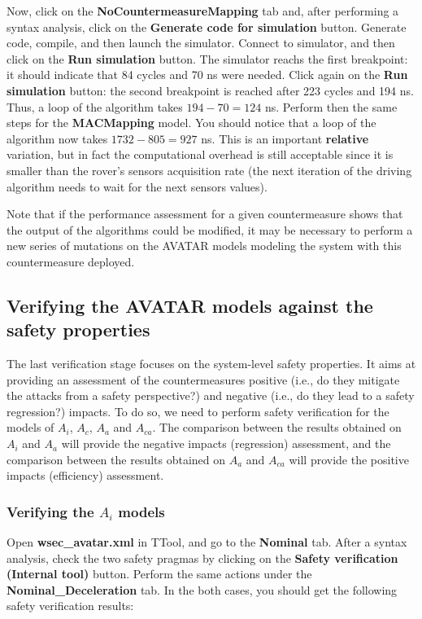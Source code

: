 \documentclass{article}
\begin{document}
Now, click on the \textbf{NoCountermeasureMapping} tab and, after performing a syntax analysis, click on the \textbf{Generate code for simulation} button. Generate code, compile, and then launch the simulator. Connect to simulator, and then click on the \textbf{Run simulation} button. The simulator reachs the first breakpoint: it should indicate that 84 cycles and 70 ns were needed. Click again on the \textbf{Run simulation} button: the second breakpoint is reached after 223 cycles and 194 ns. Thus, a loop of the algorithm takes $194 - 70 = 124$ ns. Perform then the same steps for the \textbf{MACMapping} model. You should notice that a loop of the algorithm now takes $1732 - 805 = 927$ ns. This is an important \textbf{relative} variation, but in fact the computational overhead is still acceptable since it is smaller than the rover's sensors acquisition rate (the next iteration of the driving algorithm needs to wait for the next sensors values).

Note that if the performance assessment for a given countermeasure shows that the output of the algorithms could be modified, it may be necessary to perform a new series of mutations on the AVATAR models modeling the system with this countermeasure deployed.


\subsection{Verifying the AVATAR models against the safety properties}

The last verification stage focuses on the system-level safety properties. It aims at providing an assessment of the countermeasures positive (i.e., do they mitigate the attacks from a safety perspective?) and negative (i.e., do they lead to a safety regression?) impacts. To do so, we need to perform safety verification for the models of $A_i$, $A_c$, $A_a$ and $A_{c a}$. The comparison between the results obtained on $A_i$ and $A_a$ will provide the negative impacts (regression) assessment, and the comparison between the results obtained on $A_a$ and $A_{c a}$ will provide the positive impacts (efficiency) assessment.

\subsubsection{Verifying the $A_i$ models}

Open \textbf{wsec\_avatar.xml} in TTool, and go to the \textbf{Nominal} tab. After a syntax analysis, check the two safety pragmas by clicking on the \textbf{Safety verification (Internal tool)} button. Perform the same actions under the \textbf{Nominal\_Deceleration} tab. In the both cases, you should get the following safety verification results:
\end{document}
